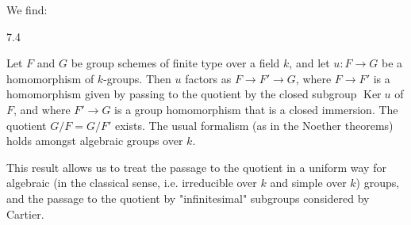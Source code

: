   We find:\begin{corollary}{7.4}\label{fga3.iii-7-corollary-7.4}\skipsinglepar\par{}Let \(F\) and \(G\) be group schemes of finite type over a field \(k\), and let \(u\colon  F\to  G\) be a homomorphism of \(k\)-groups.
    Then \(u\) factors as \(F\to  F'\to  G\), where \(F\to  F'\) is a homomorphism given by passing to the quotient by the closed subgroup \(\operatorname {Ker} u\) of \(F\), and where \(F'\to  G\) is a group homomorphism that is a closed immersion.
    The quotient \(G/F=G/F'\) exists.
    The usual formalism (as in the Noether theorems) holds amongst algebraic groups over \(k\).\end{corollary}\par{}This result allows us to treat the passage to the quotient in a uniform way for algebraic (in the classical sense, i.e. irreducible over \(k\) and simple over \(k\)) groups, and the passage to the quotient by "infinitesimal" subgroups considered by Cartier.
  
